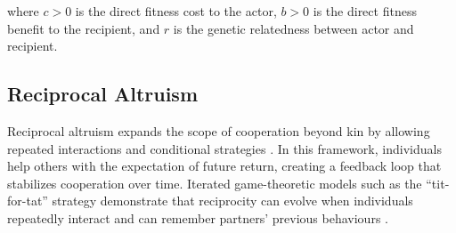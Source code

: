         where $c>0$ is the direct fitness cost to the actor, $b>0$ is the direct
        fitness benefit to the recipient, and $r$ is the genetic relatedness
        between actor and recipient\cite{hamilton1964a, hamilton1964b}.




    \subsection{Reciprocal Altruism}
        Reciprocal altruism expands the scope of cooperation beyond kin by allowing repeated interactions and conditional strategies \cite{trivers1971}.  In this framework, individuals help others with the expectation of future return, creating a feedback loop that stabilizes cooperation over time.  Iterated game-theoretic models such as the ``tit-for-tat'' strategy demonstrate that reciprocity can evolve when individuals repeatedly interact and can remember partners’ previous behaviours \cite{axelrod1981}.


